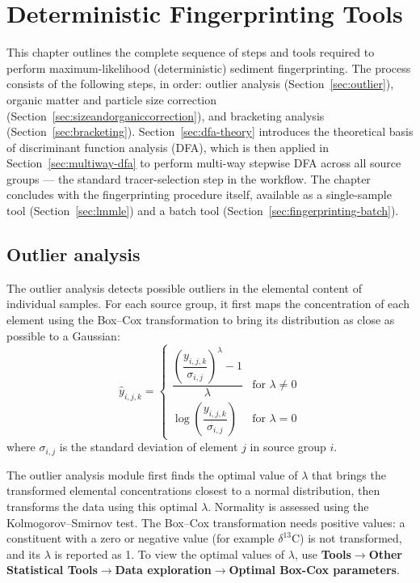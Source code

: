 \documentclass[12pt]{report}
\begin{document}
\chapter{Deterministic Fingerprinting Tools}\label{chap:deterministic}
This chapter outlines the complete sequence of steps and tools required to perform maximum-likelihood (deterministic) sediment fingerprinting. The process consists of the following steps, in order: outlier analysis (Section~\ref{sec:outlier}), organic matter and particle size correction (Section~\ref{sec:sizeandorganiccorrection}), and bracketing analysis (Section~\ref{sec:bracketing}). Section~\ref{sec:dfa-theory} introduces the theoretical basis of discriminant function analysis (DFA), which is then applied in Section~\ref{sec:multiway-dfa} to perform multi-way stepwise DFA across all source groups --- the standard tracer-selection step in the workflow. The chapter concludes with the fingerprinting procedure itself, available as a single-sample tool (Section~\ref{sec:lmmle}) and a batch tool (Section~\ref{sec:fingerprinting-batch}).

\section{Outlier analysis}
\label{sec:outlier_analysis}\label{sec:outlier}
The outlier analysis detects possible outliers in the elemental content of individual samples. For each source group, it first maps the concentration of each element using the Box--Cox transformation to bring its distribution as close as possible to a Gaussian:
\begin{equation}
     \hat{y}_{i,j,k} = \begin{cases}
   \dfrac{\left(\dfrac{y_{i,j,k}}{\sigma_{i,j}}\right)^{\lambda}-1}{\lambda} & \text{for } \lambda \neq 0 \\[1.5em]
   \log\left(\dfrac{y_{i,j,k}}{\sigma_{i,j}}\right) & \text{for } \lambda = 0
\end{cases}
\end{equation}
where $\sigma_{i,j}$ is the standard deviation of element $j$ in source group $i$.

The outlier analysis module first finds the optimal value of $\lambda$ that brings the transformed elemental concentrations closest to a normal distribution, then transforms the data using this optimal $\lambda$. Normality is assessed using the Kolmogorov--Smirnov test. The Box--Cox transformation needs positive values: a constituent with a zero or negative value (for example $\delta^{13}$C) is not transformed, and its $\lambda$ is reported as 1. To view the optimal values of $\lambda$, use \textbf{Tools}$\rightarrow$\textbf{Other Statistical Tools}$\rightarrow$\textbf{Data exploration}$\rightarrow$\textbf{Optimal Box-Cox parameters}.
\end{document}
